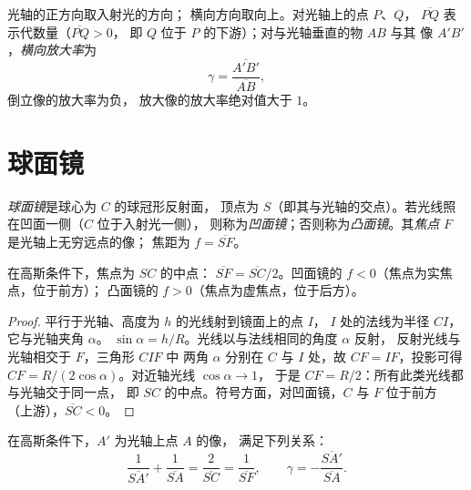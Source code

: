 \begin{notation}[代数量与放大率]\label{not:b1:mirrors-thin-lenses:signs}
光轴的正方向取入射光的方向；
横向方向取向上。对光轴上的点 $P$、$Q$，
$\overline{PQ}$ 表示代数量（$\overline{PQ} > 0$，
即 $Q$ 位于 $P$ 的下游）；对与光轴垂直的物 $AB$ 与其
像 $A'B'$，\emph{横向放大率}为
\[
\gamma = \frac{\overline{A'B'}}{\overline{AB}} ,
\]
倒立像的放大率为负，
放大像的放大率绝对值大于 $1$。
\end{notation}

\section{球面镜}

\begin{definition}[球面镜]\label{def:b1:mirrors-thin-lenses:mirror}
\emph{球面镜}是球心为 $C$ 的球冠形反射面，
顶点为 $S$（即其与光轴的交点）。若光线照在凹面一侧（$C$ 位于入射光一侧），
则称为\emph{凹面镜}；否则称为\emph{凸面镜}。其\emph{焦点}
$F$ 是光轴上无穷远点的像；
焦距为 $f = \overline{SF}$。
\end{definition}

\begin{proposition}[球面镜的焦点]\label{prop:b1:mirrors-thin-lenses:focus}
在高斯条件下，焦点为 $SC$ 的中点：
$\overline{SF} = \overline{SC}/2$。凹面镜的 $f < 0$（焦点为实焦点，位于前方）；
凸面镜的 $f > 0$（焦点为虚焦点，位于后方）。
\end{proposition}

\begin{proof}
平行于光轴、高度为 $h$ 的光线射到镜面上的点 $I$，
$I$ 处的法线为半径 $CI$，它与光轴夹角 $\alpha$。
$\sin\alpha = h/R$。光线以与法线相同的角度 $\alpha$ 反射，
反射光线与光轴相交于 $F$，三角形 $CIF$ 中
两角 $\alpha$ 分别在 $C$ 与 $I$ 处，故 $CF = IF$，投影可得
$CF = R/(2\cos\alpha)$。对近轴光线 $\cos\alpha \to 1$，
于是 $CF = R/2$：所有此类光线都与光轴交于同一点，
即 $SC$ 的中点。符号方面，对凹面镜，$C$ 与 $F$ 位于前方
（上游），$\overline{SC} < 0$。
\end{proof}

\begin{theorem}[球面镜的共轭关系]\label{thm:b1:mirrors-thin-lenses:mirrorconj}
在高斯条件下，$A'$ 为光轴上点 $A$ 的像，
满足下列关系：
\[
\frac{1}{\overline{SA'}} + \frac{1}{\overline{SA}} = \frac{2}{\overline{SC}}
= \frac{1}{\overline{SF}},
\qquad
\gamma = -\frac{\overline{SA'}}{\overline{SA}} .
\]
\end{theorem}


